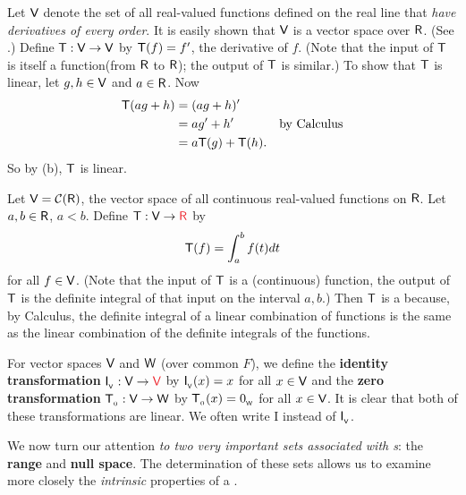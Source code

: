 \begin{example} \label{example 2.1.6}
Let \(\textsf{V}\) denote the set of all real-valued functions defined on the real line that \emph{have derivatives of every order}.
It is easily shown that \(\textsf{V}\) is a vector space over \(\textsf{R}\).
(See .)
Define \(\textsf{T} : \textsf{V} \to \textsf{V}\) by \(\textsf{T}(f) = f'\), the derivative of \(f\).
(Note that the input of \(\textsf{T}\) is itself a function(from \(\textsf{R}\) to \(\textsf{R}\)); the output of \(\textsf{T}\) is similar.)
To show that \(\textsf{T}\) is linear, let \(g, h \in \textsf{V}\) and \(a \in \textsf{R}\).
Now
\begin{align*}
    \textsf{T}(ag + h) & = (ag + h)' \\
              & = ag' + h' & \text{by Calculus} \\
              & = a\textsf{T}(g) + \textsf{T}(h).
\end{align*}
So by (b), \(\textsf{T}\) is linear.
\end{example}

\begin{example} \label{example 2.1.7}
Let \(\textsf{V} = \mathcal{C}(\textsf{R})\), the vector space of all continuous real-valued functions on \(\textsf{R}\).
Let \(a, b \in \textsf{R}\), \(a < b\).
Define \(\T : \V \to \RED{\SET{R}}\) by
\[
    \textsf{T}(f) = \int_a^b f(t) dt
\]
for all \(f \in \textsf{V}\).
(Note that the input of \(\textsf{T}\) is a (continuous) function, the output of \(\textsf{T}\) is the definite integral of that input on the interval \(a, b\).)
Then \(\textsf{T}\) is a \LTRAN{} because, by Calculus, the definite integral of a linear combination of functions is the same as the linear combination of
the definite integrals of the functions.
\end{example}

\begin{additional definition} \label{adef 2.1}
For vector spaces \(\textsf{V}\) and \(\textsf{W}\) (over common \(F\)), we define the \textbf{identity transformation} \(\ITRANV: \V \to \RED{\V}\) by \(\textsf{I}_{_{\textsf{V}}}(x) = x\) for all \(x \in \textsf{V}\) and the \textbf{zero transformation} \(\textsf{T}_{_0}: \textsf{V} \to \textsf{W}\) by \(\textsf{T}_{_0}(x) = 0_{_{\textsf{W}}}\) for all \(x \in \textsf{V}\).
It is clear that both of these transformations are linear.
We often write \(\mathrm{I}\) instead of \(\textsf{I}_{_{\textsf{V}}}\).
\end{additional definition}

We now turn our attention \emph{to two very important sets associated with \LTRAN{}s}: the \textbf{range} and \textbf{null space}.
The determination of these sets allows us to examine more closely the \emph{intrinsic} properties of a \LTRAN{}.

